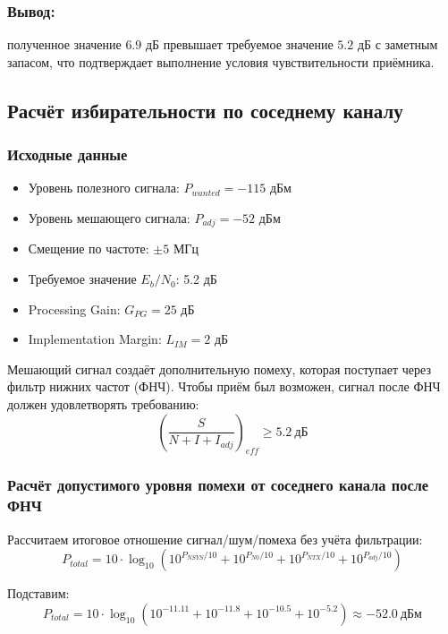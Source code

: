 \documentclass[a4paper,12pt]{article}
\begin{document}
\subsubsection{Вывод:} полученное значение $6.9$ дБ превышает требуемое значение $5.2$ дБ с заметным запасом, что подтверждает выполнение условия чувствительности приёмника.

\subsection{Расчёт избирательности по соседнему каналу}
\subsubsection{Исходные данные}
\begin{itemize}
\item Уровень полезного сигнала: $P_{wanted} = -115$ дБм
\item Уровень мешающего сигнала: $P_{adj} = -52$ дБм
\item Смещение по частоте: $\pm 5$ МГц
\item Требуемое значение $E_b/N_0$: 5.2 дБ
\item Processing Gain: $G_{PG} = 25$ дБ
\item Implementation Margin: $L_{IM} = 2$ дБ
\end{itemize}

Мешающий сигнал создаёт дополнительную помеху, которая поступает через фильтр нижних частот (ФНЧ). Чтобы приём был возможен, сигнал после ФНЧ должен удовлетворять требованию:
\begin{equation}
\left( \frac{S}{N + I + I_{adj}} \right)_{eff} \geq 5.2\ \text{дБ}
\end{equation}

\subsubsection{Расчёт допустимого уровня помехи от соседнего канала после ФНЧ}
Рассчитаем итоговое отношение сигнал/шум/помеха без учёта фильтрации:
\begin{equation}
P_{total} = 10 \cdot \log_{10}\left(10^{P_{NSYS}/10} + 10^{P_{N0}/10} + 10^{P_{NTX}/10} + 10^{P_{adj}/10} \right)
\end{equation}

Подставим:
\begin{equation}
P_{total} = 10 \cdot \log_{10}\left(10^{-11.11} + 10^{-11.8} + 10^{-10.5} + 10^{-5.2} \right) \approx -52.0\ \text{дБм}
\end{equation}
\end{document}
